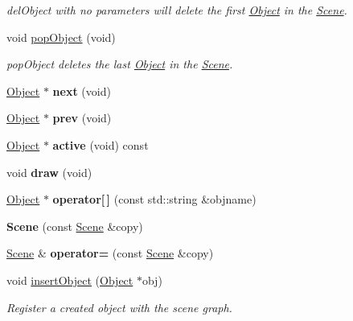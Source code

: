 \begin{DoxyCompactItemize}
\begin{DoxyCompactList}\small\item\em del\-Object with no parameters will delete the first \hyperlink{class_object}{Object} in the \hyperlink{class_scene}{Scene}. \end{DoxyCompactList}\item 
\hypertarget{class_scene_ad6c9d1d1d0c786d39bf97dc60410e28b}{void \hyperlink{class_scene_ad6c9d1d1d0c786d39bf97dc60410e28b}{pop\-Object} (void)}\label{class_scene_ad6c9d1d1d0c786d39bf97dc60410e28b}

\begin{DoxyCompactList}\small\item\em pop\-Object deletes the last \hyperlink{class_object}{Object} in the \hyperlink{class_scene}{Scene}. \end{DoxyCompactList}\item 
\hypertarget{class_scene_a70fcdad192a4c6ff508125de8af6cf4d}{\hyperlink{class_object}{Object} $\ast$ {\bfseries next} (void)}\label{class_scene_a70fcdad192a4c6ff508125de8af6cf4d}

\item 
\hypertarget{class_scene_ac852d5d763eb35b4908c9aa7ea54d1ae}{\hyperlink{class_object}{Object} $\ast$ {\bfseries prev} (void)}\label{class_scene_ac852d5d763eb35b4908c9aa7ea54d1ae}

\item 
\hypertarget{class_scene_ad0ea1a6bcf7815c63988bd937f06eb23}{\hyperlink{class_object}{Object} $\ast$ {\bfseries active} (void) const }\label{class_scene_ad0ea1a6bcf7815c63988bd937f06eb23}

\item 
\hypertarget{class_scene_a41fbbe388ea322df338648e66611ffcf}{void {\bfseries draw} (void)}\label{class_scene_a41fbbe388ea322df338648e66611ffcf}

\item 
\hypertarget{class_scene_ae9b69d8db8a46991017635f22e45baad}{\hyperlink{class_object}{Object} $\ast$ {\bfseries operator\mbox{[}$\,$\mbox{]}} (const std\-::string \&objname)}\label{class_scene_ae9b69d8db8a46991017635f22e45baad}

\item 
\hypertarget{class_scene_aa6e6354478dc7df82446b3abf9f91d96}{{\bfseries Scene} (const \hyperlink{class_scene}{Scene} \&copy)}\label{class_scene_aa6e6354478dc7df82446b3abf9f91d96}

\item 
\hypertarget{class_scene_a6336263b33b06ce4ace53599ffd8122c}{\hyperlink{class_scene}{Scene} \& {\bfseries operator=} (const \hyperlink{class_scene}{Scene} \&copy)}\label{class_scene_a6336263b33b06ce4ace53599ffd8122c}

\item 
void \hyperlink{class_scene_a8893899f0088a72642ae32a656252e7f}{insert\-Object} (\hyperlink{class_object}{Object} $\ast$obj)
\begin{DoxyCompactList}\small\item\em Register a created object with the scene graph. \end{DoxyCompactList}\end{DoxyCompactItemize}
